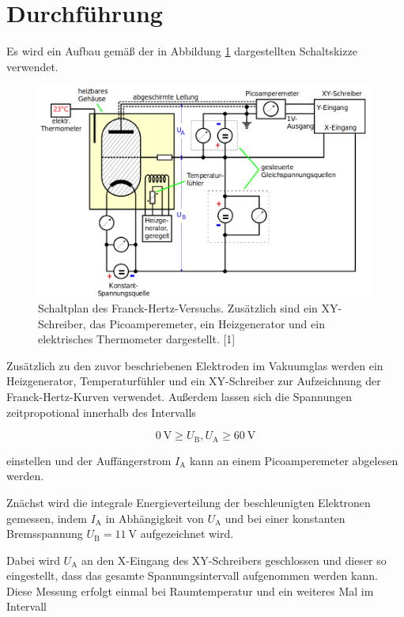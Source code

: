 \section{Durchführung}
\label{sec:Durchführung}

Es wird ein Aufbau gemäß der in Abbildung \ref{fig:bild4} dargestellten Schaltskizze
verwendet.

\begin{figure} [H]
    \centering
    \includegraphics[scale=0.4]{content/bild4.png}
    \caption{Schaltplan des Franck-Hertz-Versuchs. Zusätzlich sind ein XY-Schreiber, das Picoamperemeter, ein 
    Heizgenerator und ein elektrisches Thermometer dargestellt. [1]}
    \label{fig:bild4}
  \end{figure}

  Zusätzlich zu den zuvor beschriebenen Elektroden im Vakuumglas werden
  ein Heizgenerator, Temperaturfühler und ein XY-Schreiber zur Aufzeichnung der
  Franck-Hertz-Kurven verwendet. Außerdem lassen sich die Spannungen zeitpropotional
  innerhalb des Intervalls

  \begin{equation*}
      \SI{0}{\volt} \geq U_\text{B}, U_\text{A} \geq \SI{60}{\volt}
  \end{equation*}

  einstellen und der Auffängerstrom $I_\text{A}$ kann an einem Picoamperemeter abgelesen werden.

  Znächst wird die integrale Energieverteilung der beschleunigten Elektronen gemessen, indem
  $I_\text{A}$ in Abhängigkeit von $U_\text{A}$ und bei einer konstanten
  Bremsspannung $U_\text{B} = \SI{11}{\volt}$ aufgezeichnet wird.

  Dabei wird $U_\text{A}$ an den X-Eingang des XY-Schreibers geschlossen und dieser so eingestellt,
  dass das gesamte Spannungsintervall aufgenommen werden kann. Diese Messung erfolgt einmal
  bei Raumtemperatur und ein weiteres Mal im Intervall 

